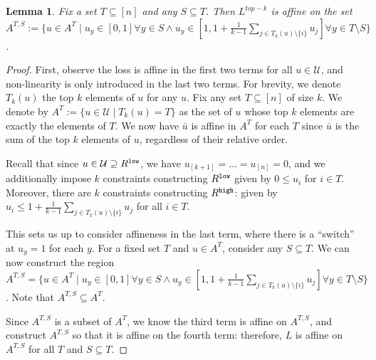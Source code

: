 \documentclass[12pt]{article}
\newcommand{\U}{\mathcal{U}}
\newtheorem{lemma}{Lemma}
\begin{document}
\begin{lemma}\label{lem:topk-affine-regions}
	Fix a set $T \subseteq [n]$ and any $S \subseteq T$.
	Then $L^{top-k}$ is affine on the set $A^{T,S} := \{u \in A^T \mid u_y \in [0,1] \forall y \in S \wedge u_y \in [1,1 + \frac 1 {k-1} \sum_{j \in T_k(u) \setminus \{i\}} u_j] \forall y \in T \setminus S \}$.
\end{lemma}
\begin{proof}
	First, observe the loss is affine in the first two terms for all $u \in \U$, and non-linearity is only introduced in the last two terms.
	For brevity, we denote $T_k(u)$ the top $k$ elements of $u$ for any $u$.
	Fix any set $T \subseteq [n]$ of size $k$.
	We denote by $A^T := \{u \in \U \mid T_k(u) = T\}$ as the set of $u$ whose top $k$ elements are exactly the elements of $T$.
	We now have $\bar u$ is affine in $A^T$ for each $T$ since $\bar u$ is the sum of the top $k$ elements of $u$, regardless of their relative order.
	
	Recall that since $u \in \U \supseteq R^{\tt low}$, we have $u_{[k+1]} = \ldots = u_{[n]} = 0$, and we additionally impose $k$ constraints constructing $R^{\tt low}$ given by $0 \leq u_{i}$ for $i \in T$.	
	Moreover, there are $k$ constraints constructing $R^{\tt high}$: given by $u_{i} \leq 1 + \frac{1}{k-1}\sum_{j \in T_k(u) \setminus \{i\}} u_j$ for all $i \in T$.
	
	This sets us up to consider affineness in the last term, where there is a ``switch'' at $u_y = 1$ for each $y$.
	For a fixed set $T$ and $u \in A^T$, consider any $S \subseteq T$.
	We can now construct the region $A^{T,S} = \{u \in A^T \mid u_y \in [0,1] \forall y \in S \wedge u_y \in [1,1 + \frac 1 {k-1} \sum_{j \in T_k(u) \setminus \{i\}} u_j] \forall y \in T \setminus S \}$.
	Note that $A^{T,S} \subseteq A^T$.
	
	Since $A^{T,S}$ is a subset of $A^T$, we know the third term is affine on $A^{T,S}$, and construct $A^{T,S}$ so that it is affine on the fourth term: therefore, $L$ is affine on $A^{T,S}$ for all $T$ and $S \subseteq T$. 
\end{proof}
\end{document}
